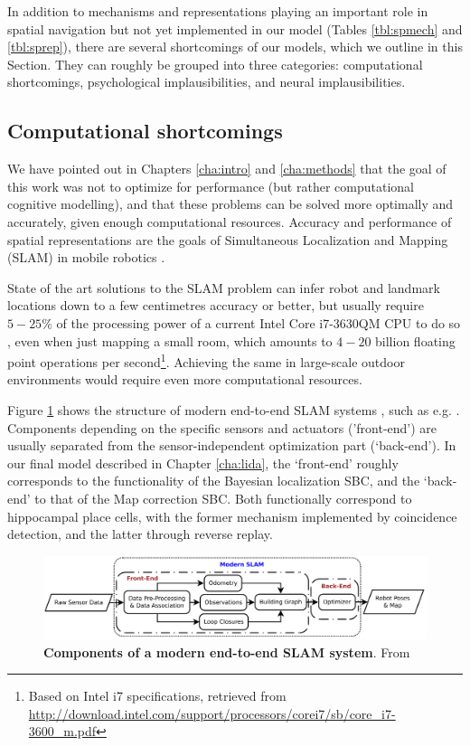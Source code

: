 In addition to mechanisms and representations playing an important role in spatial navigation but not yet implemented in our model (Tables \ref{tbl:spmech} and \ref{tbl:sprep}), there are several shortcomings of our models, which we outline in this Section. They can roughly be grouped into three categories: computational shortcomings, psychological implausibilities, and neural implausibilities.

\subsection{Computational shortcomings}

We have pointed out in Chapters \ref{cha:intro} and \ref{cha:methods} that the goal of this work was not to optimize for performance (but rather computational cognitive modelling), and that these problems can be solved more optimally and accurately, given enough computational resources. Accuracy and performance of spatial representations are the goals of Simultaneous Localization and Mapping (SLAM) in mobile robotics \citep{thrun2008simultaneous}. 

State of the art solutions to the SLAM problem can infer robot and landmark locations down to a few centimetres accuracy or better, but usually require $5-25 \%$ of the processing power of a current Intel Core i7-3630QM CPU to do so \citep{machado2013evaluation}, even when just mapping a small room, which amounts to $4-20$ billion floating point operations per second\footnote{Based on Intel i7 specifications, retrieved from  \url{http://download.intel.com/support/processors/corei7/sb/core_i7-3600_m.pdf}}. Achieving the same in large-scale outdoor environments would require even more computational resources.

Figure \ref{fig:endtoendslam} shows the structure of modern end-to-end SLAM systems \citep{wang2015}, such as e.g. \citep{newman2011describing}. Components depending on the specific sensors and actuators ('front-end') are usually separated from the sensor-independent optimization part (`back-end'). In our final model described in Chapter \ref{cha:lida}, the `front-end' roughly corresponds to the functionality of the Bayesian localization SBC, and the `back-end' to that of the Map correction SBC. Both functionally correspond to hippocampal place cells, with the former mechanism implemented by coincidence detection, and the latter through reverse replay. 

\begin{figure}[h]
	\centering
	\includegraphics[width=\textwidth]{img/endtoendslam}
	\caption[Components of a modern end-to-end SLAM system]{\textbf{Components of a modern end-to-end SLAM system}. From \citep{wang2015}} 
	\label{fig:endtoendslam}
\end{figure}


